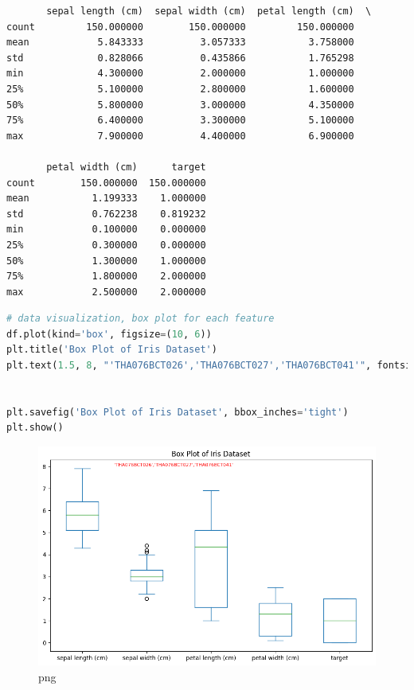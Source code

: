 \documentclass[
]{article}
\begin{document}
\begin{lstlisting}
       sepal length (cm)  sepal width (cm)  petal length (cm)  \
count         150.000000        150.000000         150.000000   
mean            5.843333          3.057333           3.758000   
std             0.828066          0.435866           1.765298   
min             4.300000          2.000000           1.000000   
25%             5.100000          2.800000           1.600000   
50%             5.800000          3.000000           4.350000   
75%             6.400000          3.300000           5.100000   
max             7.900000          4.400000           6.900000   

       petal width (cm)      target  
count        150.000000  150.000000  
mean           1.199333    1.000000  
std            0.762238    0.819232  
min            0.100000    0.000000  
25%            0.300000    0.000000  
50%            1.300000    1.000000  
75%            1.800000    2.000000  
max            2.500000    2.000000  
\end{lstlisting}

\begin{lstlisting}[language=Python]
# data visualization, box plot for each feature
df.plot(kind='box', figsize=(10, 6))
plt.title('Box Plot of Iris Dataset')
plt.text(1.5, 8, "'THA076BCT026','THA076BCT027','THA076BCT041'", fontsize=8,color='red')


plt.savefig('Box Plot of Iris Dataset', bbox_inches='tight')
plt.show()
\end{lstlisting}

\begin{figure}
\centering
\includegraphics{PCA on IRIS_files/PCA on IRIS_9_0.png}
\caption{png}
\end{figure}
\end{document}
